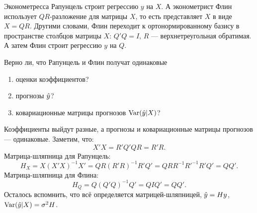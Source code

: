 \begin{problem}
Эконометресса Рапунцель строит регрессию $y$ на $X$. А эконометрист Флин использует $QR$-разложение для матрицы $X$, то есть представляет $X$ в виде $X=QR$. Другими словами, Флин переходит к ортонормированному базису в пространстве столбцов матрицы $X$: $Q'Q=I$, $R$ — верхнетреугольная обратимая. А затем Флин строит регрессию $y$ на $Q$.

Верно ли, что Рапунцель и Флин получат одинаковые
\begin{enumerate}
  \item оценки коэффициентов?
  \item прогнозы $\hat{y}$?
  \item ковариационные матрицы прогнозов $\operatorname{Var}(\hat{y}|X)$?
\end{enumerate}

\begin{sol}
Коэффициенты выйдут разные, а прогнозы и ковариационные матрицы прогнозов — одинаковые.
Заметим, что:
\[
X'X = R'Q'QR=R'R.
\]
Матрица-шляпница для Рапунцель:
\[
H_X = X(X'X)^{-1}X'=QR(R'R)^{-1}R'Q' = QRR^{-1}R'^{-1}R'Q'=QQ'.
\]
Матрица-шляпница для Флина:
\[
H_Q = Q(Q'Q)^{-1}Q' = QIQ'=QQ'.
\]
Осталось вспомнить, что всё определяется матрицей-шляпницей, $\hat{y}=Hy$, $\operatorname{Var}(\hat{y}|X)=\sigma^2 H$.
\end{sol}
\end{problem}




